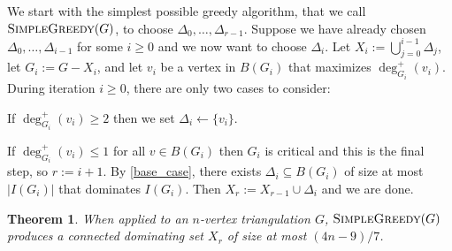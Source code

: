 \documentclass{article}
\newtheorem{thm}{Theorem}
\theoremstyle{definition}
\begin{document}
We start with the simplest possible greedy algorithm, that we call $\textsc{SimpleGreedy}(G)$, to choose $\Delta_0,\ldots,\Delta_{r-1}$.  Suppose we have already chosen $\Delta_0,\ldots,\Delta_{i-1}$ for some $i\ge 0$ and we now want to choose $\Delta_i$.  Let $X_i:=\bigcup_{j=0}^{i-1}\Delta_j$, let $G_i:=G-X_i$, and let $v_i$ be a vertex in $B(G_i)$ that maximizes $\deg^+_{G_i}(v_i)$.  During iteration $i\ge 0$, there are only two cases to consider:
\begin{compactenum}[{[}g1{]}]
    \item If $\deg^+_{G_i}(v_i)\ge 2$ then we set $\Delta_i\gets\{v_i\}$.
    \item If $\deg^+_{G_i}(v_i)\le 1$ for all $v\in B(G_i)$ then $G_i$ is critical and this is the final step, so $r:=i+1$.  By \cref{base_case}, there exists $\Delta_i\subseteq B(G_i)$ of size at most $|I(G_i)|$ that dominates $I(G_i)$. Then $X_r:=X_{r-1}\cup\Delta_{i}$ and we are done.
\end{compactenum}

\begin{thm}\label{simple_greedy}
  When applied to an $n$-vertex triangulation $G$,  $\textsc{SimpleGreedy}(G)$ produces a connected dominating set $X_r$ of size at most $(4n-9)/7$.
\end{thm}
\end{document}

